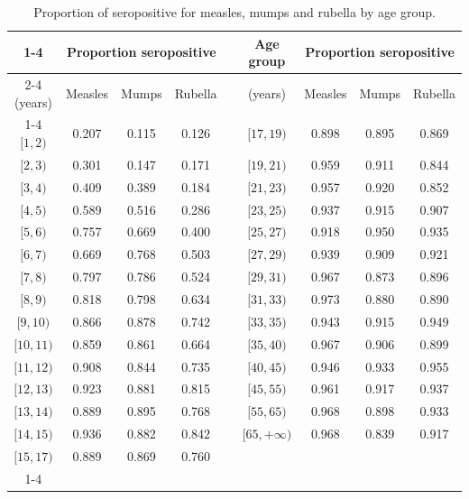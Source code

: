 \documentclass[11pt]{article}
\begin{document}
\begin{table}[ht!]
\begin{center}
\begin{tabular}{|c|c|c|c|c|c|c|c|c|}
\cline{1-4} \cline{6-9}
\multicolumn{1}{|c|}{Age group} & \multicolumn{3}{c|}{Proportion seropositive} & &
\multicolumn{1}{|c|}{Age group} & \multicolumn{3}{c|}{Proportion seropositive}\\
\cline{2-4} \cline{7-9}
(years) & Measles & Mumps & Rubella & & (years) & Measles & Mumps & Rubella \\
\cline{1-4} \cline{6-9}
$[ 1, 2)$ & 0.207 & 0.115 & 0.126 && $[17,19)$ & 0.898 & 0.895 & 0.869 \\
$[ 2, 3)$ & 0.301 & 0.147 & 0.171 && $[19,21)$ & 0.959 & 0.911 & 0.844 \\
$[ 3, 4)$ & 0.409 & 0.389 & 0.184 && $[21,23)$ & 0.957 & 0.920 & 0.852 \\
$[ 4, 5)$ & 0.589 & 0.516 & 0.286 && $[23,25)$ & 0.937 & 0.915 & 0.907 \\
$[ 5, 6)$ & 0.757 & 0.669 & 0.400 && $[25,27)$ & 0.918 & 0.950 & 0.935 \\
$[ 6, 7)$ & 0.669 & 0.768 & 0.503 && $[27,29)$ & 0.939 & 0.909 & 0.921 \\
$[ 7, 8)$ & 0.797 & 0.786 & 0.524 && $[29,31)$ & 0.967 & 0.873 & 0.896 \\
$[ 8, 9)$ & 0.818 & 0.798 & 0.634 && $[31,33)$ & 0.973 & 0.880 & 0.890 \\
$[ 9,10)$ & 0.866 & 0.878 & 0.742 && $[33,35)$ & 0.943 & 0.915 & 0.949 \\
$[10,11)$ & 0.859 & 0.861 & 0.664 && $[35,40)$ & 0.967 & 0.906 & 0.899 \\
$[11,12)$ & 0.908 & 0.844 & 0.735 && $[40,45)$ & 0.946 & 0.933 & 0.955 \\
$[12,13)$ & 0.923 & 0.881 & 0.815 && $[45,55)$ & 0.961 & 0.917 & 0.937 \\
$[13,14)$ & 0.889 & 0.895 & 0.768 && $[55,65)$ & 0.968 & 0.898 & 0.933 \\
$[14,15)$ & 0.936 & 0.882 & 0.842 && $[65,+\infty)$ & 0.968 & 0.839 & 0.917 \\
$[15,17)$ & 0.889 & 0.869 & 0.760 && & & & \\
\cline{1-4} \cline{6-9}
\end{tabular}
\end{center}
\caption{Proportion of seropositive for measles, mumps and rubella by age group.}
\label{tab1}
\end{table}
\end{document}

